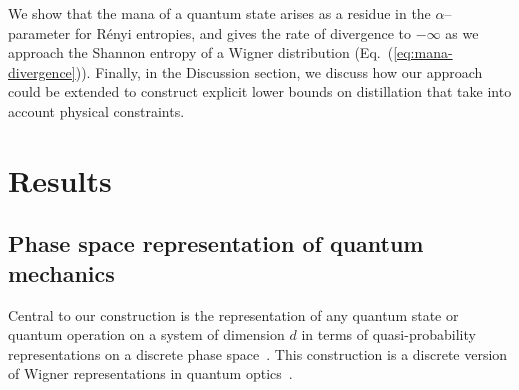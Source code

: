 \documentclass[
onecolumn,
superscriptaddress
]{revtex4-1}
\begin{document}
We show that the mana of a quantum state arises as a residue in the $\alpha$--parameter for R\'{e}nyi entropies, and gives the rate of divergence to $-\infty$ as we approach the Shannon entropy of a Wigner distribution (Eq.~(\ref{eq:mana-divergence})).
Finally, in the Discussion section, we discuss how our approach could be extended to construct explicit lower bounds on distillation that take into account physical constraints.

\section*{Results}

\subsection*{Phase space representation of quantum mechanics}

Central to our construction is the representation of any quantum state or quantum operation on a system of dimension $d$ in terms of quasi-probability representations on a discrete phase space~\cite{Gross2006, Ferrie_2008}. This construction is a discrete version of Wigner representations in quantum optics~\cite{Wigner_1932, Vourdas_2004, Kenfack_2004}.
\end{document}
